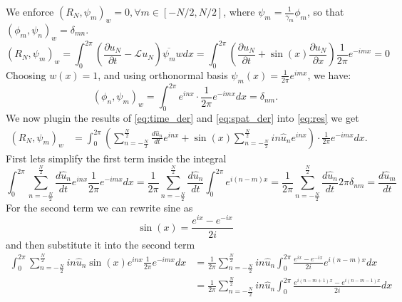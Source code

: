 We enforce $\left(R_N, \psi_m\right)_w=0, \forall m \in[-N / 2, N / 2]$, where $\psi_m=\frac{1}{\gamma_m} \phi_m$, so that $\left(\phi_m, \psi_n\right)_w=\delta_{m n}$.
\begin{equation}
	\left(R_N, \psi_m\right)_w = \int_0^{2\pi} \left(\frac{\partial u_N}{\partial t}-\mathcal{L} u_N \right)\overline{\psi_m}wdx = \int_0^{2\pi} \left (  \frac{\partial u_N}{\partial t}+\sin (x) \frac{\partial u_N}{\partial x} \right) \frac{1}{2\pi}e^{-imx} = 0
	\label{eq:res}
\end{equation}
Choosing $w(x) = 1$, and using orthonormal basis $\psi_m(x) = \frac{1}{2\pi}e^{imx}$, we have:
\begin{equation}
	(\phi_n, \psi_m)_w = \int_0^{2\pi} e^{inx} \cdot \frac{1}{2\pi} e^{-imx} dx = \delta_{nm}.
	\label{eq:weight_f}
\end{equation}
We now plugin the results of \eqref{eq:time_der} and \eqref{eq:spat_der} into \eqref{eq:res} we get
\begin{equation}
	\begin{aligned}
		\left(R_N, \psi_m\right)_w &= \int_0^{2\pi} \left( \sum_{n=-\frac{N}{2}}^{\frac{N}{2}} \frac{d \hat{u}_n}{dt} e^{inx} + \sin(x) \sum_{n=-\frac{N}{2}}^{\frac{N}{2}} i n \hat{u}_n e^{inx} \right) \cdot \frac{1}{2\pi} e^{-imx} dx.
	\end{aligned}
	\label{eq:res_der}
\end{equation}
First lets simplify the first term inside the integral
\begin{equation}
	\int_0^{2 \pi} \sum_{n=-\frac{N}{2}}^{\frac{N}{2}}  \frac{d \hat{u}_n}{dt} e^{inx} \frac{1}{2\pi} e^{-imx} dx = \frac{1}{2\pi}\sum_{n=-\frac{N}{2}}^{\frac{N}{2}}  \frac{d \hat{u}_n}{dt} \int_0^{2 \pi} e^{i(n-m)x} = \frac{1}{2\pi}\sum_{n=-\frac{N}{2}}^{\frac{N}{2}}  \frac{d \hat{u}_n}{dt} 2 \pi \delta_{nm} = \frac{d \hat{u}_m}{dt}
	\label{eq:res_first}
\end{equation}
For the second term we can rewrite sine as
\begin{equation}
	\sin(x) = \frac{e^{ix} - e^{-ix}}{2i}
	\label{eq:sin_exp}
\end{equation}
and then substitute it into the second term
\begin{equation}
	\begin{aligned}
		\int_0^{2\pi} \sum_{n=-\frac{N}{2}}^{\frac{N}{2}} i n \hat{u}_n \sin(x)  e^{inx} \frac{1}{2\pi} e^{-imx} dx & = \frac{1}{2\pi}  \sum_{n=-\frac{N}{2}}^{\frac{N}{2}} i n \hat{u}_n  \int_0^{2\pi} \frac{e^{ix} - e^{-ix}}{2i} e^{i(n-m)x} dx       \\
		                                                                                             & =  \frac{1}{2\pi}  \sum_{n=-\frac{N}{2}}^{\frac{N}{2}} i n \hat{u}_n  \int_0^{2\pi} \frac{e^{i(n-m + 1)x} - e^{i(n-m -1) x}}{2i} dx \\
		\label{eq:res_second}
	\end{aligned}
\end{equation}
